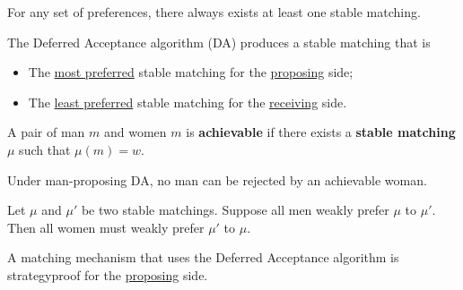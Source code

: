 \documentclass{article}
\begin{document}
	\begin{theorem}
		For any set of preferences, there always exists at least one stable matching.
	\end{theorem}
	
%
	
	\begin{theorem}
		The Deferred Acceptance algorithm (DA) produces a stable matching that is
		\begin{itemize}
			\item The \ul{most preferred} stable matching for the \ul{proposing} side;
			\item The \ul{least preferred} stable matching for the \ul{receiving} side.
		\end{itemize}
	\end{theorem}
	
	\begin{proposition}
		A pair of man $m$ and women $m$ is \textbf{achievable} if there exists a \textbf{stable matching} $\mu$ such that $\mu(m) = w$.
	\end{proposition}
	
	\begin{proposition}
		Under man-proposing DA, no man can be rejected by an achievable woman.
	\end{proposition}
	
	\begin{proposition}
		Let $\mu$ and $\mu'$ be two stable matchings. Suppose all men weakly prefer $\mu$ to $\mu'$. Then all women must weakly prefer $\mu'$ to $\mu$.
	\end{proposition}
	
	\begin{theorem}
		A matching mechanism that uses the Deferred Acceptance algorithm is strategyproof for the \ul{proposing} side.
	\end{theorem}
	
\end{document}
